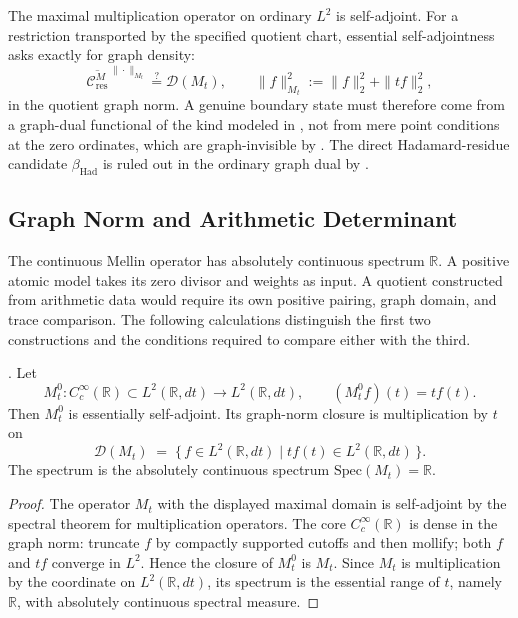 \begin{remark}
\label{v4-arith:w9-r4:rem:deficiency-calculation-answer}
The maximal multiplication operator on ordinary $L^2$ is
self-adjoint. For a restriction transported by the specified quotient
chart, essential self-adjointness asks exactly for graph density:
\[
\overline{\mathcal{C}_{\mathrm{res}}^{M}}^{\,\|\cdot\|_{M_{t}}}
\stackrel{?}{=}
\mathcal{D}(M_{t}),
\qquad
\|f\|_{M_{t}}^{2}:=\|f\|_{2}^{2}+\|t f\|_{2}^{2},
\]
in the quotient graph norm. A genuine boundary state must therefore
come from a graph-dual functional of the kind modeled in
, not from mere
point conditions at the zero ordinates, which are graph-invisible by
. The direct
Hadamard-residue candidate \(\beta_{\mathrm{Had}}\) is ruled out in
the ordinary graph dual by
.
\end{remark}

\subsection{Graph Norm and Arithmetic Determinant}
\label{v4-arith:w9-r4:pdnf:execution-attempt}

The continuous Mellin operator has absolutely continuous spectrum
$\mathbb R$. A positive atomic model takes its zero divisor and
weights as input. A quotient constructed from arithmetic data would
require its own positive pairing, graph domain, and trace comparison.
The following calculations distinguish the first two constructions
and the conditions required to compare either with the third.

\begin{lemma}
\label{v4-arith:w9-r4:lem:meyer-line-graph-closure}
\ClaimStatusProvedHere. Let
\[
M_{t}^{0}:C_{c}^{\infty}(\mathbb{R})\subset L^{2}(\mathbb{R},dt)
\longrightarrow L^{2}(\mathbb{R},dt),
\qquad
(M_{t}^{0}f)(t)=t f(t).
\]
Then \(M_{t}^{0}\) is essentially self-adjoint. Its graph-norm
closure is multiplication by \(t\) on
\[
\mathcal{D}(M_{t})
\;=\;
\{\,f\in L^{2}(\mathbb{R},dt)\mid t f(t)\in L^{2}(\mathbb{R},dt)\,\}.
\]
The spectrum is the absolutely continuous spectrum
\(\mathrm{Spec}(M_{t})=\mathbb{R}\).
\end{lemma}

\begin{proof}
The operator \(M_{t}\) with the displayed maximal domain is
self-adjoint by the spectral theorem for multiplication operators.
The core \(C_{c}^{\infty}(\mathbb{R})\) is dense in the graph norm:
truncate \(f\) by compactly supported cutoffs and then mollify; both
\(f\) and \(t f\) converge in \(L^{2}\). Hence the closure of
\(M_{t}^{0}\) is \(M_{t}\). Since \(M_{t}\) is multiplication by the
coordinate on \(L^{2}(\mathbb{R},dt)\), its spectrum is the essential
range of \(t\), namely \(\mathbb{R}\), with absolutely continuous
spectral measure.
\end{proof}


